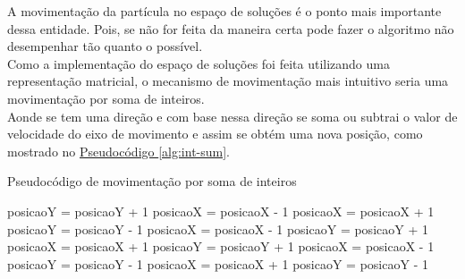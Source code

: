 \indent A movimentação da partícula no espaço de soluções é o ponto mais importante dessa entidade. Pois, se não for feita da maneira certa pode fazer o algoritmo não desempenhar tão quanto o possível.\\
\indent Como a implementação do espaço de soluções foi feita utilizando uma representação matricial, o mecanismo de movimentação mais intuitivo seria uma movimentação por soma de inteiros.\\
\indent Aonde se tem uma direção e com base nessa direção se soma ou subtrai o valor de velocidade do eixo de movimento e assim se obtém uma nova posição, como mostrado no \hyperref[alg:int-sum]{Pseudocódigo \ref{alg:int-sum}}.
\begin{algorithm}
    \caption{Pseudocódigo de movimentação por soma de inteiros}\label{alg:int-sum}
\begin{algorithmic}
  \State posicaoY = posicaoY + 1
  \State posicaoX = posicaoX - 1
  \State posicaoX = posicaoX + 1
  \State posicaoY = posicaoY - 1
  \State posicaoX = posicaoX - 1
  \State posicaoY = posicaoY + 1
  \State posicaoX = posicaoX + 1
  \State posicaoY = posicaoY + 1
  \State posicaoX = posicaoX - 1
  \State posicaoY = posicaoY - 1
  \State posicaoX = posicaoX + 1
  \State posicaoY = posicaoY - 1
\EndIf    

\end{algorithmic}
\end{algorithm}

